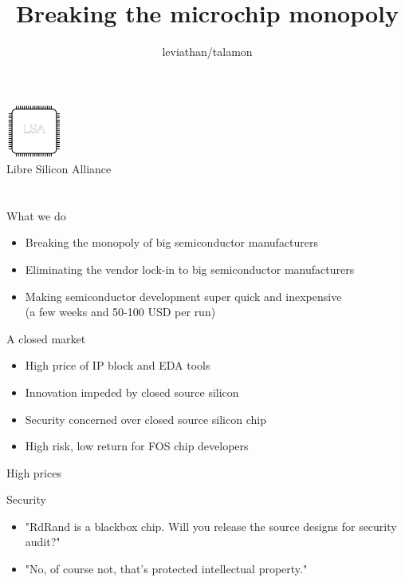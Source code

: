 \documentclass[9pt]{beamer}
\author{leviathan/talamon}
\title{Breaking the microchip monopoly}
\begin{document}
\begin{frame}
	\titlepage
	\begin{center}
		\includegraphics[width=50pt,height=50pt]{lsa.png}
		\\ Libre Silicon Alliance
	\end{center}
\end{frame}


\section[What]{}
\begin{frame}{What we do}
	\begin{itemize}
        \setlength\itemsep{1em}
		\item Breaking the monopoly of big semiconductor manufacturers
		\item Eliminating the vendor lock-in to big semiconductor manufacturers
		\item Making semiconductor development super quick and inexpensive \\ (a few weeks and 50-100 USD per run)
	\end{itemize}
\end{frame}

\begin{frame}{A closed market}
	\begin{itemize}
        \setlength\itemsep{1em}
		\item High price of IP block and EDA tools
		\item Innovation impeded by closed source silicon
		\item Security concerned over closed source silicon chip
		\item High risk, low return for FOS chip developers
	\end{itemize}
\end{frame}

\begin{frame}{High prices}

\end{frame}

\begin{frame}{Security}
	\begin{itemize}
        \setlength\itemsep{1em}
        \item "RdRand is a blackbox chip. Will you release the source designs for security audit?"
        \item "No, of course not, that's protected intellectual property."
	\end{itemize}    
\end{frame}
\end{document}
